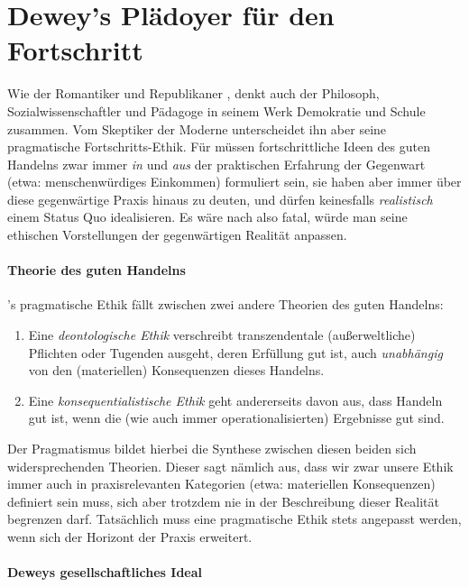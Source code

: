 \section[Epilog]{Dewey's Plädoyer für den Fortschritt}

Wie der Romantiker und Republikaner \citeauthor{rousseau-1762}, denkt auch der Philosoph, Sozialwissenschaftler und Pädagoge \citeauthor{Dewey2010} in seinem Werk Demokratie und Schule zusammen.
Vom Skeptiker der Moderne \citeauthor{Rousseau-1762-b} unterscheidet ihn aber seine pragmatische Fortschritts-Ethik.
Für \citeauthor{Dewey2010} müssen fortschrittliche Ideen des guten Handelns zwar immer \emph{in} und \emph{aus} der praktischen Erfahrung der Gegenwart (etwa: menschenwürdiges Einkommen) formuliert sein, sie haben aber immer über diese gegenwärtige Praxis hinaus zu deuten, und dürfen keinesfalls \emph{realistisch} einem Status Quo idealisieren.
Es wäre nach \citeauthor{Dewey2010} also fatal, würde man seine ethischen Vorstellungen der gegenwärtigen Realität anpassen.


\paragraph{Theorie des guten Handelns}

\citeauthor{Dewey1932}'s pragmatische Ethik fällt zwischen zwei andere Theorien des guten Handelns:

\begin{enumerate}
	\item Eine \emph{deontologische Ethik} verschreibt transzendentale (außerweltliche) Pflichten oder Tugenden ausgeht, deren Erfüllung gut ist, auch \emph{unabhängig} von den (materiellen) Konsequenzen dieses Handelns.
	\item Eine \emph{konsequentialistische Ethik} geht andererseits davon aus, dass Handeln gut ist, wenn die (wie auch immer operationalisierten) Ergebnisse gut sind.
\end{enumerate}

Der Pragmatismus bildet hierbei die Synthese zwischen diesen beiden sich widersprechenden Theorien.
Dieser sagt nämlich aus, dass wir zwar unsere Ethik immer auch in praxisrelevanten Kategorien (etwa: materiellen Konsequenzen) definiert sein muss, sich aber trotzdem nie in der Beschreibung dieser Realität begrenzen darf.
Tatsächlich muss eine pragmatische Ethik stets angepasst werden, wenn sich der Horizont der Praxis erweitert.


\paragraph{Deweys gesellschaftliches Ideal}


